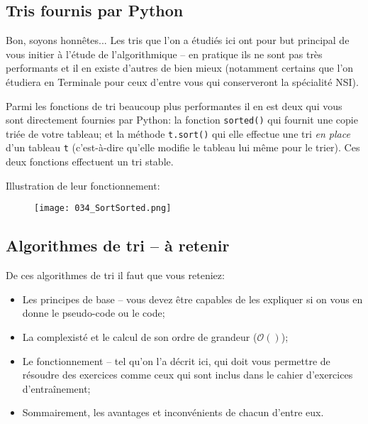 \documentclass[12pt]{article}
\begin{document}
	\subsection{Tris fournis par Python}
	Bon, soyons honnêtes... Les tris que l'on a étudiés ici ont pour but principal de vous initier à l'étude de l'algorithmique -- en pratique ils ne sont pas très performants et il en existe d'autres de bien mieux (notamment certains que l'on étudiera en Terminale pour ceux d'entre vous qui conserveront la spécialité NSI).
	
	Parmi les fonctions de tri beaucoup plus performantes il en est deux qui vous sont directement fournies par Python: la fonction \texttt{sorted()} qui fournit une copie triée de votre tableau; et la méthode \texttt{t.sort()} qui elle effectue une tri \textit{en place} d'un tableau \texttt{t} (c'est-à-dire qu'elle modifie le tableau lui même pour le trier). Ces deux fonctions effectuent un tri stable.
	
	Illustration de leur fonctionnement:
	\begin{figure}[H]
		\centering
		\texttt{[image: 034\_SortSorted.png]}
	\end{figure}
	
	\subsection{Algorithmes de tri -- à retenir}
		\begin{MonRet}
		De ces algorithmes de tri il faut que vous reteniez:
		\begin{itemize}
			\item Les principes de base -- vous devez être capables de les expliquer si on vous en donne le pseudo-code ou le code;
			\item La complexisté et le calcul de son ordre de grandeur ($\mathcal{O}()$);
			\item Le fonctionnement -- tel qu'on l'a décrit ici, qui doit vous permettre de résoudre des exercices comme ceux qui sont inclus dans le cahier d'exercices d'entraînement;
			\item Sommairement, les avantages et inconvénients de chacun d'entre eux.
		\end{itemize}
	\end{MonRet}
	
\end{document}
